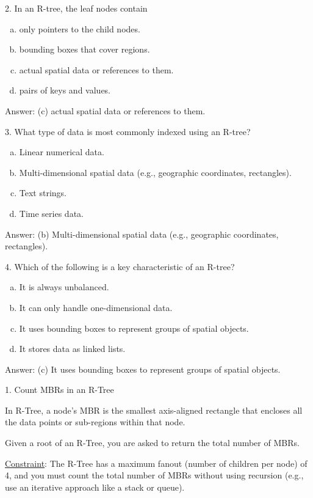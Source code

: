 \documentclass{article}
\begin{document}
\begin{question}{2. In an R-tree, the leaf nodes contain}
	\begin{enumerate}[(a)]
		\item only pointers to the child nodes.
		\item bounding boxes that cover regions.
		\item actual spatial data or references to them.
		\item pairs of keys and values.
	\end{enumerate}
\end{question}
Answer: (c) actual spatial data or references to them.

\begin{question}{3. What type of data is most commonly indexed using an R-tree?}
	\begin{enumerate}[(a)]
		\item Linear numerical data.
		\item Multi-dimensional spatial data (e.g., geographic coordinates, rectangles).
		\item Text strings.
		\item Time series data.
	\end{enumerate}
\end{question}
Answer: (b) Multi-dimensional spatial data (e.g., geographic coordinates, rectangles).

\begin{question}{4. Which of the following is a key characteristic of an R-tree?}
	\begin{enumerate}[(a)]
		\item It is always unbalanced.
		\item It can only handle one-dimensional data.
		\item It uses bounding boxes to represent groups of spatial objects.
		\item It stores data as linked lists.
	\end{enumerate}
\end{question}
Answer: (c) It uses bounding boxes to represent groups of spatial objects.

\begin{question}{1. Count MBRs in an R-Tree}

	\quad In R-Tree, a node’s MBR is the smallest axis-aligned rectangle that encloses all the data points or sub-regions within that node.

	\quad Given a root of an R-Tree, you are asked to return the total number of MBRs.

	\quad \underline{Constraint}: The  R-Tree has a maximum fanout (number of children per node) of 4, and you must count the total number of MBRs without using recursion (e.g., use an iterative approach like a stack or queue).
\end{question}
\end{document}
